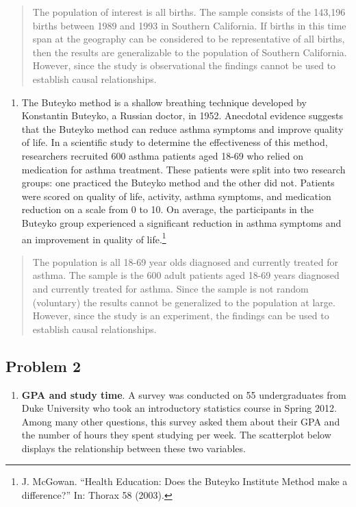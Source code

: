\documentclass[
]{book}
\providecommand{\tightlist}{%
  \setlength{\itemsep}{0pt}\setlength{\parskip}{0pt}}
\begin{document}
\begin{quote}
The population of interest is all births. The sample consists of the 143,196 births between 1989 and 1993 in Southern California. If births in this time span at the geography can be considered to be representative of all births, then the results are generalizable to the population of Southern California. However, since the study is observational the findings cannot be used to establish causal relationships.
\end{quote}

\begin{enumerate}
\def\labelenumi{\alph{enumi}.}
\setcounter{enumi}{1}
\tightlist
\item
  The Buteyko method is a shallow breathing technique developed by Konstantin Buteyko, a Russian doctor, in 1952. Anecdotal evidence suggests that the Buteyko method can reduce asthma symptoms and improve quality of life. In a scientific study to determine the effectiveness of this method, researchers recruited 600 asthma patients aged 18-69 who relied on medication for asthma treatment. These patients were split into two research groups: one practiced the Buteyko method and the other did not. Patients were scored on quality of life, activity, asthma symptoms, and medication reduction on a scale from 0 to 10. On average, the participants in the Buteyko group experienced a significant reduction in asthma symptoms and an improvement in quality of life.\footnote{J. McGowan. ``Health Education: Does the Buteyko Institute Method make a difference?'' In: Thorax 58 (2003).}
\end{enumerate}

\begin{quote}
The population is all 18-69 year olds diagnosed and currently treated for asthma. The sample is the 600 adult patients aged 18-69 years diagnosed and currently treated for asthma. Since the sample is not random (voluntary) the results cannot be generalized to the population at large. However, since the study is an experiment, the findings can
be used to establish causal relationships.
\end{quote}

\pagebreak

\hypertarget{problem-2-2}{%
\subsection{Problem 2}\label{problem-2-2}}

\begin{enumerate}
\def\labelenumi{\arabic{enumi}.}
\setcounter{enumi}{1}
\tightlist
\item
  \textbf{GPA and study time}. A survey was conducted on 55 undergraduates from Duke University who took an introductory statistics course in Spring 2012. Among many other questions, this survey asked them about their GPA and the number of hours they spent studying per week. The scatterplot below displays the relationship between these two variables.
\end{enumerate}
\end{document}

